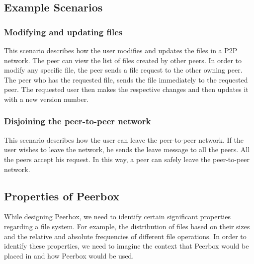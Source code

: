 
\subsection{Example Scenarios}


\subsubsection{Modifying and updating files}
This scenario describes how the user modifies and updates the files in a P2P network. The peer can view the list of files created by other peers. In order to modify any specific file, the peer sends a file request to the other owning peer. The peer who has the requested file, sends the file immediately to the requested peer. The requested user then makes the respective changes and then updates it with a new version number.  

\subsubsection{Disjoining the peer-to-peer network}
This scenario describes how the user can leave the peer-to-peer network. If the user wishes to leave the network, he sends the leave message to all the peers. All the peers accept his request. In this way, a peer can safely leave the peer-to-peer network.

\subsection{Properties of Peerbox}

While designing Peerbox, we need to identify certain significant properties regarding a file system. For example, the distribution of files based on their sizes and the relative and absolute frequencies of different file operations. In order to identify these properties, we need to imagine the context that Peerbox would be placed in and how Peerbox would be used.

